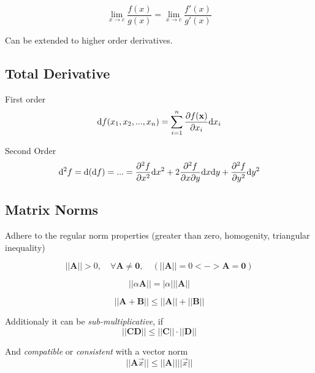 \documentclass[
    a4paper,
    11pt
]{article}
\begin{document}
\begin{equation}
    \lim_{x\to c} \frac{f(x)}{g(x)} = \lim_{x\to c} \frac{f'(x)}{g'(x)}
\end{equation}

Can be extended to higher order derivatives.

\subsection{Total Derivative}

First order
\begin{equation}
    \mathrm{d}f(x_1, x_2, ..., x_n) = \sum_{i=1}^n \pdv{f(\mathbf{x})}{x_i}
    \mathrm{d} x_i
\end{equation}

Second Order
\begin{equation}
    \mathrm{d}^2f = \mathrm{d}(\mathrm{d}f) = ... = \pdv[2]{f}{x} \mathrm{d}x^2 +
    2 \pdv[2]{f}{x}{y} \mathrm{d}x\mathrm{d}y + \pdv[2]{f}{y} \mathrm{d}y^2
\end{equation}

\subsection{Matrix Norms}

Adhere to the regular norm properties (greater than zero, homogenity, triangular
inequality)

\begin{equation}
    ||\mathbf{A}|| > 0, \quad \forall \mathbf{A} \neq \mathbf{0}, \quad
    (||\mathbf{A}|| = 0 <-> \mathbf{A} = \mathbf{0})
\end{equation}

\begin{equation}
    ||\alpha \mathbf{A}|| = |\alpha| ||\mathbf{A}||
\end{equation}

\begin{equation}
    ||\mathbf{A} + \mathbf{B}|| \leq ||\mathbf{A}|| + ||\mathbf{B}||
\end{equation}

Additionaly it can be \textit{sub-multiplicative}, if
\begin{equation}
    ||\mathbf{CD}|| \leq ||\mathbf{C}||\cdot ||\mathbf{D}||
\end{equation}

And \textit{compatible} or \textit{consistent} with a vector norm
\begin{equation}
    ||\mathbf{A} \vec{x}|| \leq ||\mathbf{A}|| ||\vec{x}||
\end{equation}
\end{document}
